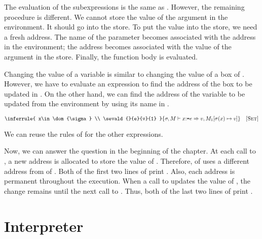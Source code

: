 The evaluation of the subexpressions is the same as \bfae. However, the remaining
procedure is different. We cannot store the value of the argument in the
environment. It should go into the store. To put the value into the store, we
need a fresh address. The name of the parameter becomes associated with the
address in the environment; the address becomes associated with the value of the
argument in the store. Finally, the function body is evaluated.

Changing the value of a variable is similar to changing the value of a box of
\bfae. However, we have to evaluate an expression to find the address of the box
to be updated in \bfae. On the other hand, we can find the address of the
variable to be updated from the environment by using its name in \lang.


\vspace{-1em}

\[
  \inferrule
  {
    x\in\dom{\sigma} \\
    \sevald{}{e}{v}{1}
  }
  { \seval{\sigma}{M}{\eset{x}{e}}{v}{M_1[\sigma(x)\mapsto v]} }
  \quad\textsc{[Set]}
\]

We can reuse the rules of \bfae for the other expressions.

Now, we can answer the question in the beginning of the chapter. At each call to
, a new address is allocated to store the value of .
Therefore,  of  uses a different address from  of
. Both of the first two lines of  print .
Also, each address is permanent throughout the execution. When
a call to  updates the value of , the change remains
until the next call to . Thus, both of the last two lines of
 print .

\section{Interpreter}

